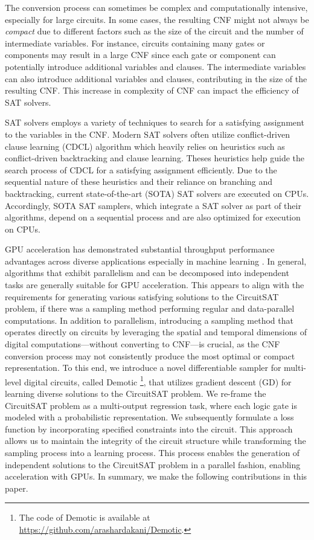 The conversion process can sometimes be complex and computationally intensive, especially for large circuits. In some cases, the resulting CNF might not always be \textit{compact} due to different factors such as the size of the circuit and the number of intermediate variables. For instance, circuits containing many gates or components may result in a large CNF since each gate or component can potentially introduce additional variables and clauses. The intermediate variables can also introduce additional variables and clauses, contributing in the size of the resulting CNF. This increase in complexity of CNF can impact the efficiency of SAT solvers. 

SAT solvers employs a variety of techniques to search for a satisfying assignment to the variables in the CNF. Modern SAT solvers \cite{Niklas2003SAT, Moskewicz2001Chaff, Audemard2018Glucose} often utilize conflict-driven clause learning (CDCL) algorithm \cite{Silva1996CDCL, silva2021CDCL} which heavily relies on heuristics such as conflict-driven backtracking and clause learning. Theses heuristics help guide the search process of CDCL for a satisfying assignment efficiently. Due to the sequential nature of these heuristics and their reliance on branching and backtracking, current state-of-the-art (SOTA) SAT solvers are executed on CPUs. Accordingly, SOTA SAT samplers, which integrate a SAT solver as part of their algorithms, depend on a sequential process and are also optimized for execution on CPUs.


GPU acceleration has demonstrated substantial throughput performance advantages across diverse applications especially in machine learning \cite{Krizhevsky2012AlexNet}. In general, algorithms that exhibit parallelism and can be decomposed into independent tasks are generally suitable for GPU acceleration. This appears to align with the requirements for generating various satisfying solutions to the CircuitSAT problem, if there was a sampling method performing regular and data-parallel computations. In addition to parallelism, introducing a sampling method that operates directly on circuits by leveraging the spatial and temporal dimensions of digital computations—without converting to CNF—is crucial, as the CNF conversion process may not consistently produce the most optimal or compact representation. To this end, we introduce a novel differentiable sampler for multi-level digital circuits, called {\sc Demotic} \footnote{The code of {\sc Demotic} is available at \url{https://github.com/arashardakani/Demotic}.}, that utilizes gradient descent (GD) for learning diverse solutions to the CircuitSAT problem. We re-frame the CircuitSAT problem as a multi-output regression task, where each logic gate is modeled with a probabilistic representation. We subsequently formulate a loss function by incorporating specified constraints into the circuit. This approach allows us to maintain the integrity of the circuit structure while transforming the sampling process into a learning process. This process enables the generation of independent solutions to the CircuitSAT problem in a parallel fashion, enabling acceleration with GPUs. In summary, we make the following contributions in this paper.

